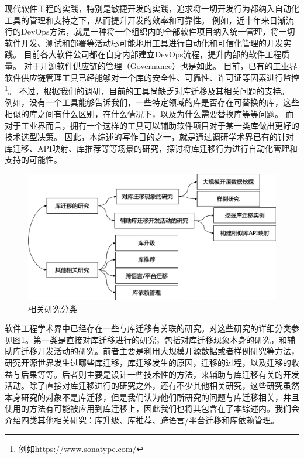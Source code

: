 \documentclass[UTF8]{ctexart}
\begin{document}
现代软件工程的实践，特别是敏捷开发的实践，追求将一切开发行为都纳入自动化工具的管理和支持之下，从而提升开发的效率和可靠性。
例如，近十年来日渐流行的DevOps方法，就是一种将一个组织内的全部软件项目纳入统一管理，将一切软件开发、测试和部署等活动尽可能地用工具进行自动化和可信化管理的开发实践\cite{2016IEEESoftware-Ebert-DevOps, 2019ACMSurvey-Leonardo-SurveyDevOps}。
目前各大软件公司都在自身内部建立DevOps流程，提升内部的软件工程质量。
对于开源软件供应链的管理（Governance）也是如此。
目前，已有的工业界软件供应链管理工具已经能够对一个库的安全性、可靠性、许可证等因素进行监控\footnote{例如\url{https://www.sonatype.com/}}。
不过，根据我们的调研，目前的工具尚缺乏对库迁移及其相关问题的支持。
例如，没有一个工具能够告诉我们，一些特定领域的库是否存在可替换的库，这些相似的库之间有什么区别，在什么情况下，以及为什么需要替换库等等问题。
而对于工业界而言，拥有一个这样的工具可以辅助软件项目对于某一类库做出更好的技术选型决策。
因此，本综述的写作目的之一，就是通过调研学术界已有的针对库迁移、API映射、库推荐等等场景的研究，探讨将库迁移行为进行自动化管理和支持的可能性。


\begin{figure}
\centering
\includegraphics[width=\textwidth]{fig/paper_summary.png}
\caption{相关研究分类}
\label{fig:paper-summary} 
\end{figure}

软件工程学术界中已经存在一些与库迁移有关联的研究。对这些研究的详细分类参见图\ref{fig:paper-summary}。第一类是直接对库迁移进行的研究，包括对库迁移现象本身的研究，和辅助库迁移开发活动的研究。前者主要是利用大规模开源数据或者样例研究等方法，研究开源世界发生过哪些库迁移，库迁移发生的原因，迁移的过程，以及迁移的收益与后果等等。后者则主要是设计一些技术性的方法，来辅助与库迁移有关的开发活动。除了直接对库迁移进行的研究之外，还有不少其他相关研究，这些研究虽然本身研究的对象不是库迁移，但是我们认为他们所研究的问题与库迁移相关，并且使用的方法有可能被应用到库迁移上，因此我们也将其包含在了本综述内。我们会介绍四类其他相关研究：库升级、库推荐、跨语言/平台迁移和库依赖管理。
\end{document}
